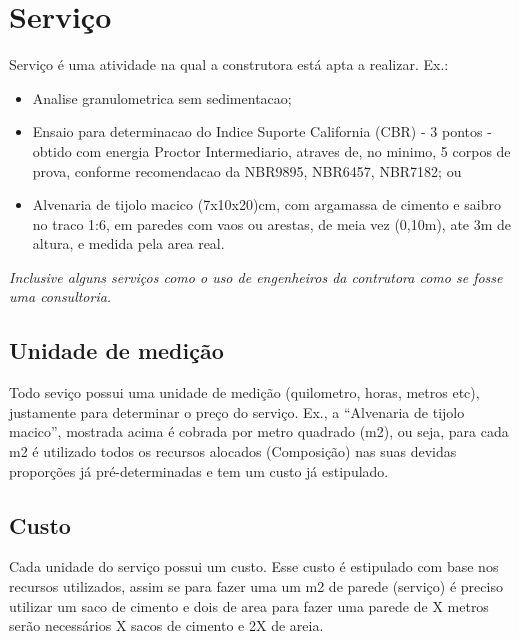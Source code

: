 \chapter{Serviço}

Serviço é uma atividade na qual a construtora está apta a realizar. Ex.:

\begin{itemize}
	\item Analise granulometrica sem sedimentacao;
	\item Ensaio para determinacao do Indice Suporte California (CBR) - 3 pontos - obtido com energia Proctor Intermediario, atraves de, no minimo, 5 corpos de prova, conforme recomendacao da NBR9895, NBR6457, NBR7182; ou
	\item Alvenaria de tijolo macico (7x10x20)cm, com argamassa de cimento e saibro no traco 1:6, em paredes com vaos ou arestas, de meia vez (0,10m), ate 3m de altura, e medida pela area real.
\end{itemize}

\emph{Inclusive alguns serviços como o uso de engenheiros da contrutora como se fosse uma consultoria.}

\section{Unidade de medição}

Todo seviço possui uma unidade de medição (quilometro, horas, metros etc), justamente para determinar o preço do serviço. Ex., a ``Alvenaria de tijolo macico'', mostrada acima é cobrada por metro quadrado (m2), ou seja, para cada m2 é utilizado todos os recursos alocados (Composição) nas suas devidas proporções já pré-determinadas e tem um custo já estipulado.

\section{Custo}

Cada unidade do serviço possui um custo. Esse custo é estipulado com base nos recursos utilizados, assim se para fazer uma um m2 de parede (serviço) é preciso utilizar um saco de cimento e dois de area para fazer uma parede de X metros serão necessários X sacos de cimento e 2X de areia.